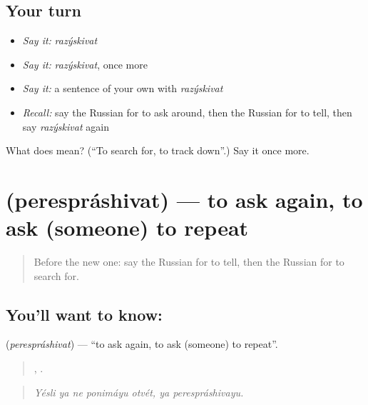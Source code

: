 \subsection*{Your turn}
\begin{itemize}
\raggedright
  \item \emph{Say it:} \emph{razýskivat}
  \item \emph{Say it:} \emph{razýskivat}, once more
  \item \emph{Say it:} a sentence of your own with \emph{razýskivat}
  \item \emph{Recall:} say the Russian for to ask around, then the Russian for to tell, then say \emph{razýskivat} again
\end{itemize}

\begin{tcolorbox}[breakable,colback=teal!4,colframe=teal!35!black,title={Before you move on}]
What does  mean? (\textquotedblleft{}To search for, to track down\textquotedblright{}.) Say it once more.
\end{tcolorbox}
\section[\texorpdfstring{\ru{переспрашивать} (perespráshivat)}{переспрашивать (perespráshivat)}]{ (perespráshivat) — to ask again, to ask (someone) to repeat}

\label{lesson:RU-C441-peresprashivat}



\begin{quote}
Before the new one: say the Russian for to tell, then the Russian for to search for.
\end{quote}

\subsection*{You'll want to know: }
\textbf{} (\emph{perespráshivat}) — \textquotedblleft{}to ask again, to ask (someone) to repeat\textquotedblright{}.

\begin{quote}
    ,  .
\end{quote}

\begin{quote}
\emph{Yésli ya ne ponimáyu otvét, ya perespráshivayu.}
\end{quote}

